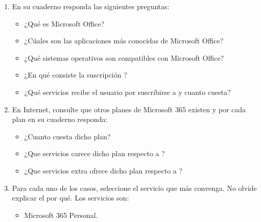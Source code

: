 \documentclass[letterpaper,10pt,spanish]{sphinxmanual}
\begin{document}
\begin{enumerate}
\begin{itemize}
\item {} 
\sphinxAtStartPar
¿Que servicios carece dicho plan respecto a ?

\item {} 
\sphinxAtStartPar
¿Que servicios extra ofrece dicho plan respecto a ?

\end{itemize}

\item {} 
\sphinxAtStartPar
En su cuaderno responda las siguientes preguntas:
\begin{itemize}
\item {} 
\sphinxAtStartPar
¿Qué es Microsoft Office?

\item {} 
\sphinxAtStartPar
¿Cúales son las aplicaciones más conocidas de Microsoft Office?

\item {} 
\sphinxAtStartPar
¿Qué sistemas operativos son compatibles con Microsoft Office?

\item {} 
\sphinxAtStartPar
¿En qué consiste la suscripción ?

\item {} 
\sphinxAtStartPar
¿Qué servicios recibe el usuario por suscribirse a  y cuanto cuesta?

\end{itemize}

\item {} 
\sphinxAtStartPar
En Internet, consulte que otros planes de Microsoft 365 existen y por cada plan en su cuaderno responda:
\begin{itemize}
\item {} 
\sphinxAtStartPar
¿Cuanto cuesta dicho plan?

\item {} 
\sphinxAtStartPar
¿Que servicios carece dicho plan respecto a ?

\item {} 
\sphinxAtStartPar
¿Que servicios extra ofrece dicho plan respecto a ?

\end{itemize}

\item {} 
\sphinxAtStartPar
Para cada uno de los casos, seleccione el servicio que más convenga. No olvide explicar el por qué. Los servicios son:
\begin{itemize}
\item {} 
\sphinxAtStartPar
Microsoft 365 Personal.


\end{itemize}
\end{enumerate}
\end{document}
